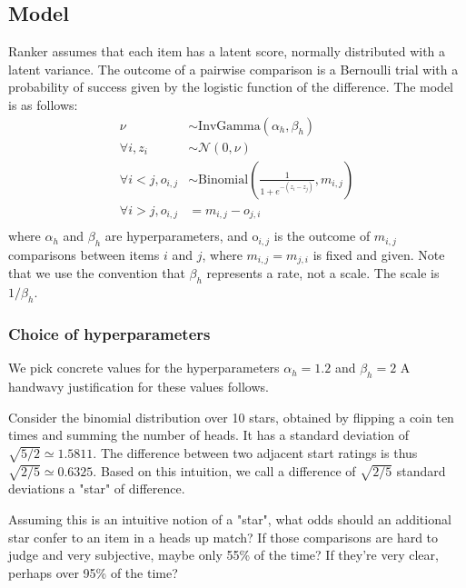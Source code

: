 \documentclass[12pt]{article}
\begin{document}
\subsection{Model}
    Ranker assumes that each item has a latent score, normally distributed with a latent
    variance. The outcome of a pairwise comparison is a Bernoulli trial with a probability
    of success given by the logistic function of the difference. The model is as follows:
    \begin{equation}
        \begin{aligned}
            \nu &\sim \text{InvGamma}(\alpha_h, \beta_h) \\
            \forall i, z_i &\sim \mathcal{N}(0, \nu) \\
            \forall i < j, o_{i,j} &\sim \text{Binomial}\left(\frac{1}{1 + e^{-(z_i - z_j)}}, m_{i,j}\right) \\
            \forall i > j, o_{i,j} &= m_{i,j} - o_{j,i} \\
        \end{aligned}
    \end{equation}
    where $\alpha_h$ and $\beta_h$ are hyperparameters, and $\text{o}_{i,j}$ is the outcome of $m_{i,j}$ comparisons
    between items $i$ and $j$, where $m_{i,j} = m_{j, i}$ is fixed and given. Note that we use the convention that $\beta_h$ represents
    a rate, not a scale. The scale is $1 / \beta_h$.

    \subsubsection{Choice of hyperparameters}
    We pick concrete values for the hyperparameters $\alpha_h = 1.2$ and $\beta_h = 2$
    A handwavy justification for these values follows.

    Consider the binomial distribution over 10 stars, obtained by flipping a coin
    ten times and summing the number of heads. It has a standard deviation of
    $\sqrt{5/2} \simeq 1.5811$. The difference between two adjacent start ratings is thus
    $\sqrt{2/5} \simeq 0.6325$. Based on this intuition, we call a difference of $\sqrt{2/5}$ standard deviations
    a "star" of difference.

    Assuming this is an intuitive notion of a "star", what odds
    should an additional star confer to an item in a heads up match?
    If those comparisons are hard to judge and very subjective, maybe only 55\% of the time?
    If they're very clear, perhaps over 95\% of the time?
\end{document}
